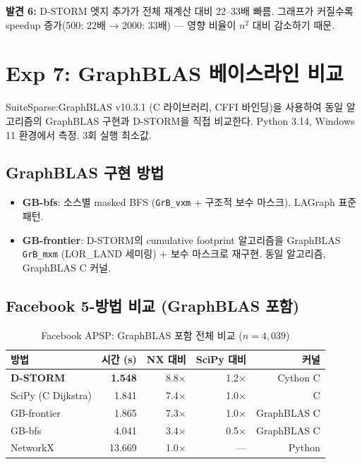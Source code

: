 \documentclass[11pt,a4paper]{article}
\begin{document}
\textbf{발견 6:} D-STORM 엣지 추가가 전체 재계산 대비 22--33배 빠름. 그래프가 커질수록 speedup 증가(500: 22배 → 2000: 33배) --- 영향 비율이 $n^2$ 대비 감소하기 때문.

\section{Exp 7: GraphBLAS 베이스라인 비교}

SuiteSparse:GraphBLAS v10.3.1 (C 라이브러리, CFFI 바인딩)을 사용하여 동일 알고리즘의 GraphBLAS 구현과 D-STORM을 직접 비교한다. Python 3.14, Windows 11 환경에서 측정. 3회 실행 최소값.

\subsection{GraphBLAS 구현 방법}
\begin{itemize}
  \item \textbf{GB-bfs}: 소스별 masked BFS (\texttt{GrB\_vxm} + 구조적 보수 마스크). LAGraph 표준 패턴.
  \item \textbf{GB-frontier}: D-STORM의 cumulative footprint 알고리즘을 GraphBLAS \texttt{GrB\_mxm} (LOR\_LAND 세미링) + 보수 마스크로 재구현. 동일 알고리즘, GraphBLAS C 커널.
\end{itemize}

\subsection{Facebook 5-방법 비교 (GraphBLAS 포함)}

\begin{table}[ht]\centering
\caption{Facebook APSP: GraphBLAS 포함 전체 비교 ($n\!=\!4{,}039$)}
\begin{tabular}{@{}lrrrr@{}}
\toprule
\textbf{방법} & \textbf{시간 (s)} & \textbf{NX 대비} & \textbf{SciPy 대비} & \textbf{커널} \\
\midrule
\textbf{D-STORM} & \textbf{1.548} & 8.8$\times$ & 1.2$\times$ & Cython C \\
SciPy (C Dijkstra) & 1.841 & 7.4$\times$ & 1.0$\times$ & C \\
GB-frontier & 1.865 & 7.3$\times$ & 1.0$\times$ & GraphBLAS C \\
GB-bfs & 4.041 & 3.4$\times$ & 0.5$\times$ & GraphBLAS C \\
NetworkX & 13.669 & 1.0$\times$ & --- & Python \\
\bottomrule
\end{tabular}
\end{table}
\end{document}
